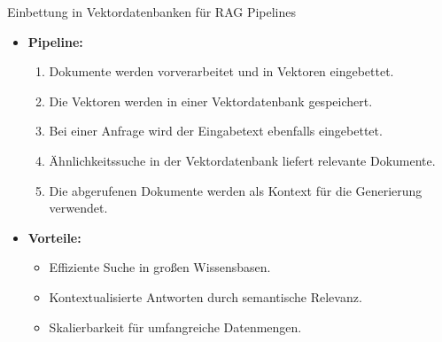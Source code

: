 \documentclass[aspectratio=1610, xcolor=dvipsnames, 9pt]{beamer}
\begin{document}
\begin{frame}{Einbettung in Vektordatenbanken für RAG Pipelines}
  \begin{itemize}
    \item \textbf{Pipeline:}
      \begin{enumerate}
        \item Dokumente werden vorverarbeitet und in Vektoren eingebettet. \\
        \item Die Vektoren werden in einer Vektordatenbank gespeichert.\\
        \item Bei einer Anfrage wird der Eingabetext ebenfalls eingebettet. \\
        \item Ähnlichkeitssuche in der Vektordatenbank liefert relevante Dokumente. \\
        \item Die abgerufenen Dokumente werden als Kontext für die Generierung verwendet. 
      \end{enumerate}
    \item \textbf{Vorteile:}
      \begin{itemize}
        \item Effiziente Suche in großen Wissensbasen.
        \item Kontextualisierte Antworten durch semantische Relevanz.
        \item Skalierbarkeit für umfangreiche Datenmengen.
      \end{itemize}
  \end{itemize}
\end{frame}
\end{document}
